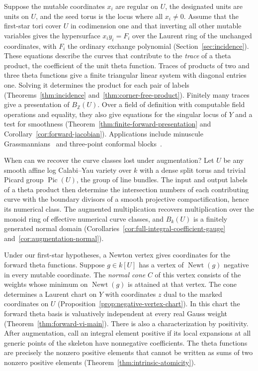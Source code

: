 \documentclass[11pt,reqno]{amsart}
\numberwithin{equation}{section}
\theoremstyle{definition}
\theoremstyle{remark}
\DeclareMathOperator{\Newt}{Newt}
\DeclareMathOperator{\Pic}{Pic}
\begin{document}
Suppose the mutable coordinates \(x_i\) are regular on \(U\), the
designated units are units on \(U\), and the seed torus is the locus
where all \(x_i\ne0\). Assume that the first-star tori
cover \(U\) in codimension one and that inverting all other mutable
variables gives the hypersurface \(x_i y_i=F_i\) over the Laurent ring
of the unchanged coordinates, with \(F_i\) the ordinary exchange
polynomial (Section~\ref{sec:incidence}). These equations describe
the curves that contribute to the \emph{trace} of a theta product,
the coefficient of the unit theta function. Traces of products of two
and three theta functions give a finite triangular linear system with
diagonal entries one. Solving it determines the product for each pair
of labels (Theorems~\ref{thm:incidence} and~\ref{thm:corner-free-product}).
Finitely many traces give a presentation of \(B_{\mathbb Z}(U)\). Over
a field of definition with computable field operations and equality,
they also give equations for the singular locus of \(Y\) and a test
for smoothness (Theorem~\ref{thm:finite-forward-presentation} and
Corollary~\ref{cor:forward-jacobian}). Applications include minuscule
Grassmannians~\cite{Minuscule} and three-point conformal blocks~\cite{Fusion}.

When can we recover the curve classes lost under augmentation? Let
\(U\) be any smooth affine log Calabi--Yau variety over \(k\) with a
dense split torus and trivial Picard group \(\Pic(U)\), the group of
line bundles. The input and output labels of a theta product then
determine the intersection numbers of each contributing curve with the
boundary divisors of a smooth projective compactification, hence its
numerical class. The augmented multiplication recovers multiplication
over the monoid ring of effective numerical curve classes, and
\(B_k(U)\) is a finitely generated normal domain
(Corollaries~\ref{cor:full-integral-coefficient-gauge} and~\ref{cor:augmentation-normal}).

Under our first-star hypotheses, a Newton vertex gives coordinates
for the forward theta functions. Suppose \(g\in k[U]\) has a vertex
of \(\Newt(g)\) negative in every mutable coordinate. The \emph{normal
cone} \(C\) of this vertex consists of the weights whose minimum on \(\Newt(g)\) is
attained at that vertex. The cone determines a Laurent chart on \(Y\)
with coordinates \(z\) dual to the marked coordinates on \(U\)
(Proposition~\ref{prop:negative-vertex-chart}). In this chart the
forward theta basis is valuatively independent at every real Gauss weight
(Theorem~\ref{thm:forward-vi-main}). There is also a characterization
by positivity. After augmentation, call an integral element positive if
its local expansions at all generic points of the skeleton have
nonnegative coefficients. The theta functions are precisely the nonzero
positive elements that cannot be written as sums of two nonzero positive elements
(Theorem~\ref{thm:intrinsic-atomicity}).
\end{document}
